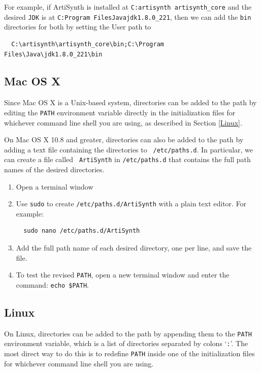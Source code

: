 \documentclass{article}
\begin{document}
For example, if ArtiSynth is installed at {\tt C:\BKS artisynth\BKS
artisynth\_core} and the desired {\tt JDK} is at {\tt C:\BKS Program
Files\BKS Java\BKS jdk1.8.0\_221}, then we can add the {\tt bin}
directories for both by setting the User path to
\begin{verbatim}
  C:\artisynth\artisynth_core\bin;C:\Program Files\Java\jdk1.8.0_221\bin
\end{verbatim}

\subsection*{Mac OS X}

Since Mac OS X is a Unix-based system, directories can be added to the
path by editing the {\tt PATH} environment variable directly in the
initialization files for whichever command line shell you are using,
as described in Section \ref{Linux}.

On Mac OS X 10.8 and greater, directories can also be added to the
path by adding a text file containing the directories to {\tt
/etc/paths.d}.  In particular, we can create a file called {\tt
ArtiSynth} in {\tt /etc/paths.d} that contains the full path names of
the desired directories.

\begin{enumerate}

\item Open a terminal window

\item Use {\tt sudo} to create {\tt /etc/paths.d/ArtiSynth} with a plain
text editor. For example:
\begin{verbatim}
  sudo nano /etc/paths.d/ArtiSynth
\end{verbatim}

\item Add the full path name of each desired directory, one per line,
and save the file.

\item To test the revised {\tt PATH}, open a new terminal
window and enter the command: {\tt echo \$PATH}.

\end{enumerate}

\subsection*{Linux}
\label{Linux}

On Linux, directories can be added to the path by appending them to
the {\tt PATH} environment variable, which is a list of directories
separated by colons `{\tt :}'. The most direct way to do this is to
redefine {\tt PATH} inside one of the initialization files for
whichever command line shell you are using.
\end{document}
